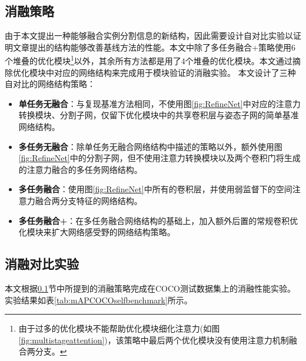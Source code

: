 \subsection{消融策略}
\label{subsec:selfstrategy}
由于本文提出一种能够融合实例分割信息的新结构，因此需要设计自对比实验以证明文章提出的结构能够改善基线方法的性能。本文中除了多任务融合+策略使用6个堆叠的优化模块\footnote{由于过多的优化模块不能帮助优化模块细化注意力(如图\ref{fig:multistageattention})，该策略中最后两个优化模块没有使用注意力机制融合两分支。}以外，其余所有方法都是用了4个堆叠的优化模块。本文通过摘除优化模块中对应的网络结构来完成用于模块验证的消融实验。
本文设计了三种自对比的网络结构策略：
\begin{itemize}
	\item \textbf{单任务无融合}：与复现基准方法相同，不使用图\ref{fig:RefineNet}中对应的注意力转换模块、分割子网，仅留下优化模块中的共享卷积层与姿态子网的简单基准网络结构。
	\item \textbf{多任务无融合}：除单任务无融合网络结构中描述的策略以外，额外使用图\ref{fig:RefineNet}中的分割子网，但不使用注意力转换模块以及两个卷积门将生成的注意力融合的多任务网络结构。
	\item \textbf{多任务融合}：使用图\ref{fig:RefineNet}中所有的卷积层，并使用弱监督下的空间注意力融合两分支特征的网络结构。
	\item \textbf{多任务融合+}：在多任务融合网络结构的基础上，加入额外后置的常规卷积优化模块来扩大网络感受野的网络结构策略。
\end{itemize}

\subsection{消融对比实验}
\label{subsec:selfeval}

本文根据\ref{subsec:selfstrategy}节中所提到的消融策略完成在COCO测试数据集上的消融性能实验。实验结果如表\ref{tab:mAPCOCOselfbenchmark}所示。

